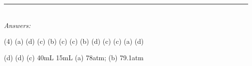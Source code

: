 \documentclass[main.tex]{subfiles}
\begin{document}
\begin{fullwidth}
\begin{multicols}{2}
\begin{enumerate}[resume]




 \end{enumerate}
\end{multicols}
\end{fullwidth}
\begin{fullwidth}
\par\noindent\rule{0.5\textwidth}{0.4pt}\\
\emph{Answers:}\\
\vspace{-0.5cm}
\begin{tasks}[counter-format={tsk[1].}, label-align=left, label-offset={0mm}, label-width={5mm}, item-indent={1mm}, label-format={\bfseries}](4)
\task (a) 
\task (d) 
\task (c) 
\task (b)
\task (c)
\task (c)
\task (b) 
\task (d) 
\task (c) 
\task (c) 
\task (a) 
\task (d) 

\task (d) 
\task (d) 
\task (c)
\task 40mL
\task 15mL
 \task \small {}
\task (a) 78atm; (b) 79.1atm

\end{tasks}






\end{fullwidth}
\restoregeometry
\end{document}
